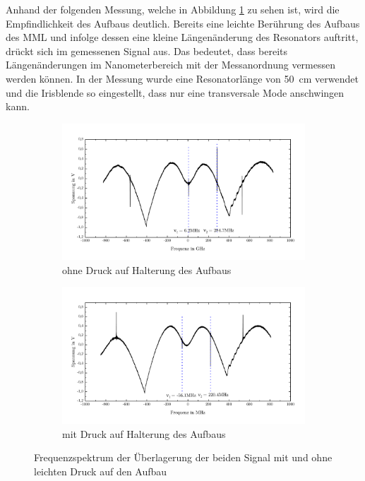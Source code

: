 \documentclass[a4paper,twoside,final]{article}
\begin{document}
%
Anhand der folgenden Messung, welche in Abbildung \ref{fig:berührung} zu sehen ist, wird die Empfindlichkeit des Aufbaus deutlich. Bereits eine leichte Berührung des Aufbaus des MML und infolge dessen eine kleine Längenänderung des Resonators auftritt, drückt sich im gemessenen Signal aus. Das bedeutet, dass bereits Längenänderungen im Nanometerbereich mit der Messanordnung vermessen werden können. In der Messung wurde eine Resonatorlänge von \SI{50}{\centi\meter} verwendet und die Irisblende so eingestellt, dass nur eine transversale Mode anschwingen kann.

\begin{figure}[htp]
  \centering
  \begin{subfigure}{0.8\textwidth}
    \includegraphics[width=\textwidth]{Bilder/ungedrueckt_50cm_1Mode.pdf}
    \caption{ohne Druck auf Halterung des Aufbaus}
  \end{subfigure}
  \begin{subfigure}{0.8\textwidth}
    \includegraphics[width=\textwidth]{Bilder/gedrueckt_50cm_1Mode.pdf}
    \caption{mit Druck auf Halterung des Aufbaus}
  \end{subfigure}
  \caption{Frequenzspektrum der Überlagerung der beiden Signal mit und ohne leichten Druck auf den Aufbau}
  \label{fig:berührung}
\end{figure}
\end{document}
